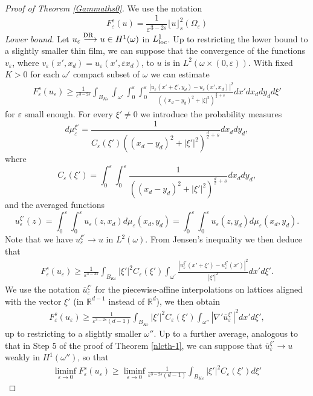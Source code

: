 \documentclass[11pt]{article}
\def\e{\varepsilon}
\begin{document}
\begin{proof}[Proof of Theorem \rm\ref{Gammaths0}] We use the notation
$$
F^s_\e(u)=\frac{1}{\e^{3-2s}}\lfloor u\rfloor_{s}^2(\Omega_\e)
$$
{\em Lower bound.}
Let $u_\e\buildrel{\hbox {\rm\scriptsize DR }\, \, }\over{\longrightarrow} u\in H^1(\omega)$ in $L^1_{\rm loc}$. Up to restricting the lower bound to a slightly smaller thin film, we can suppose that the convergence of the functions $v_\e$, where $v_\e(x',x_d)= u_\e(x', \e x_d)$, to $u$ is in $L^2(\omega\times (0,\e))$. With fixed $K>0$ for each $\omega'$ compact subset of $\omega$ we can estimate
\begin{eqnarray}
\label{newest}
F^s_\e(u_\e)\ge\frac{1}{\e^{3-2s}}\int_{B_{K\e}}\int_{\omega'}
\int_0^\e\int_0^\e \frac{|u_\e(x'+\xi',y_d)-u_\e(x',x_d)|^2}{((x_d-y_d)^2+|\xi|^2)^{\frac d2+s}}dx' dx_d dy_d d\xi'
\end{eqnarray}
for $\e$ small enough.
For every $\xi'\neq 0$ we introduce the probability measures
$$
d\mu_\e^{\xi'}=\frac{1}{C_\e(\xi') ((x_d-y_d)^2+|\xi'|^2)^{\frac d2+s}}dx_d dy_d,
$$
where
\begin{equation}\label{defCexi}
C_\e(\xi')=\int_0^\e\int_0^\e\frac{1}{((x_d-y_d)^2+|\xi'|^2)^{\frac d2+s}}dx_d dy_d,
\end{equation}
and the averaged functions
$$
u^{\xi'}_\e(z)=\int_0^\e\int_0^\e u_\e(z,x_d)d\mu_\e(x_d,y_d)=\int_0^\e\int_0^\e u_\e(z,y_d)d\mu_\e(x_d,y_d).
$$
Note that we have $u^{\xi'}_\e\to u$ in $L^2(\omega)$. From Jensen's inequality we then deduce that
\begin{eqnarray*}
F^s_\e(u_\e)\ge\frac{1}{\e^{3-2s}}\int_{B_{K\e}}|\xi'|^2 C_\e(\xi') \int_{\omega'}
\frac{|u^{\xi'}_\e(x'+\xi')-u^{\xi'}_\e(x')|^2}{|\xi'|^2} dx' d\xi'.
\end{eqnarray*}
We use the notation $\overline u_\e^{\xi'}$ for the piecewise-affine interpolations on lattices aligned with the vector $\xi'$ (in $\mathbb R^{d-1}$ instead of $\mathbb R^d$), we then obtain 
\begin{eqnarray}\label{corpo}
F^s_\e(u_\e)\ge\frac{1}{\e^{3-2s}(d-1)}\int_{B_{K\e}}|\xi'|^2 C_\e(\xi') \int_{\omega''}
|\nabla'\overline u_\e^{\xi'}|^2 dx' d\xi',
\end{eqnarray}
up to restricting to a slightly smaller $\omega''$. Up to a further average, analogous to that in Step 5 of the proof of Theorem \ref{nlcth-1}, we can suppose that $\overline u_\e^{\xi'}\to u$ weakly in $H^1(\omega'')$, 
so that 
\begin{eqnarray}\label{newest-2}
\liminf_{\e\to 0}F^s_\e(u_\e)\ge\liminf_{\e\to 0}\frac{1}{\e^{3-2s}(d-1)}\int_{B_{K\e}}|\xi'|^2 C_\e(\xi') d\xi'

\end{eqnarray}
\end{proof}
\end{document}
